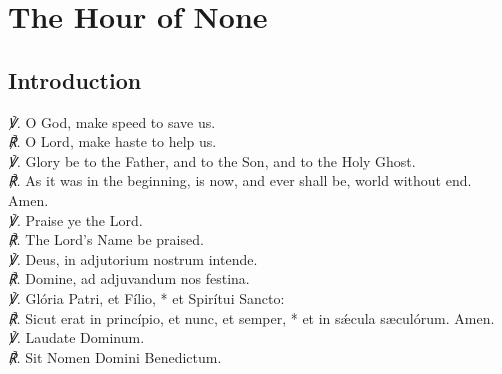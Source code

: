 \section{The Hour of None}
\subsection{Introduction}
\englat
{
\textit{\scshape ℣.} O God, {} make speed to save us.\\
\textit{\scshape ℟.} O Lord, make haste to help us.\\
\textit{\scshape ℣.} Glory be to the Father, and to the Son, and to the Holy Ghost.\\
\textit{\scshape ℟.} As it was in the beginning, is now, and ever shall be, world without end. Amen.\\
\textit{\scshape ℣.} Praise ye the Lord.\\
\textit{\scshape ℟.} The Lord's Name be praised.\\
}
{
\textit{\scshape ℣.} Deus, {} in adjutorium nostrum intende.\\
\textit{\scshape ℟.} Domine, ad adjuvandum nos festina.\\
\textit{\scshape ℣.} Glória Patri, et Fílio, * et Spirítui Sancto:\\
\textit{\scshape ℟.} Sicut erat in princípio, et nunc, et semper, * et in sǽcula s{\ae}culórum. Amen.\\
\textit{\scshape ℣.} Laudate Dominum.\\
\textit{\scshape ℟.} Sit Nomen Domini Benedictum.\\
}
